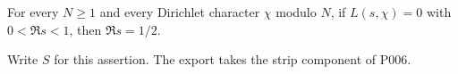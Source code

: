 
\begin{formalstatement}\label{pn:P004}
For every $N\ge1$ and every Dirichlet character $\chi$ modulo $N$, if $L(s,\chi)=0$ with $0<\Re s<1$, then $\Re s=1/2$.
\end{formalstatement}
Write $S$ for this assertion. The export takes the strip component of P006.
